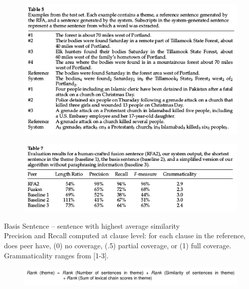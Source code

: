 \documentclass[xcolor={table}]{beamer}
\begin{document}
\begin{frame}[t]{\cite{barzilay2005sentence}}
      \begin{figure}[h]
          \centering
      \includegraphics[scale=.3]{images/table5-barzilay05.png} \\
  \end{figure}
\end{frame}
\begin{frame}[t]{\cite{barzilay2005sentence}}
      \begin{figure}[h]
          \centering
      \includegraphics[scale=.4]{images/table7-barzilay05.png} \\
  \end{figure}
  Basis Sentence -- sentence with highest average similarity \\
  Precision and Recall computed at clause level: for each clause in the 
  reference, does peer have, (0) no coverage, (.5) partial coverage, or (1) 
  full coverage.\\
  Grammaticality ranges from [1-3].

\end{frame}

\begin{frame}[t]{\cite{barzilay2005sentence}}
      \begin{figure}[h]
          \centering
      \includegraphics[scale=.25]{images/rank-barzilay05.png} \\
\end{figure}
\end{frame}
\end{document}
